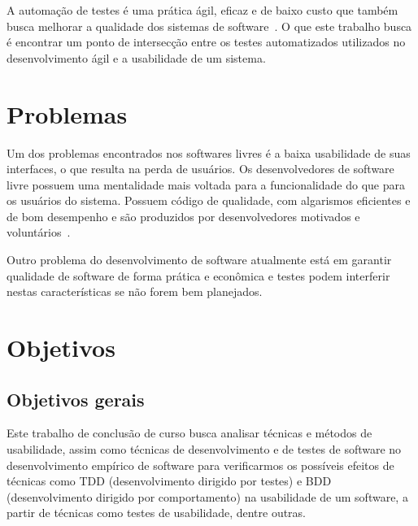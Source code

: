 

A automação de testes é uma prática ágil, eficaz e de baixo custo que também busca melhorar a qualidade dos sistemas de software~\cite{cotter1995}. O que este trabalho busca é encontrar um ponto de intersecção entre os testes automatizados utilizados no desenvolvimento ágil e a usabilidade de um sistema.

 

\section{Problemas}

Um dos problemas encontrados nos softwares livres é a baixa usabilidade de suas interfaces, o que resulta na perda de usuários. 
%
Os desenvolvedores de software livre possuem uma mentalidade mais voltada para a funcionalidade do que para os usuários do sistema. Possuem código de qualidade, com algarismos eficientes e de bom desempenho e são produzidos por desenvolvedores motivados e voluntários~\cite{santos2012}. 

Outro problema do desenvolvimento de software atualmente está em garantir qualidade de software de forma prática e econômica e testes podem interferir nestas características se não forem bem planejados.


\section{Objetivos}

\subsection{Objetivos gerais}
	 
Este trabalho de conclusão de curso busca analisar técnicas e métodos de usabilidade, assim como técnicas de desenvolvimento e de testes de software no desenvolvimento empírico de software para verificarmos os possíveis efeitos de técnicas como TDD (desenvolvimento dirigido por testes) e BDD (desenvolvimento dirigido por comportamento) na usabilidade de um software, a partir de técnicas como testes de usabilidade, dentre outras.
	 
